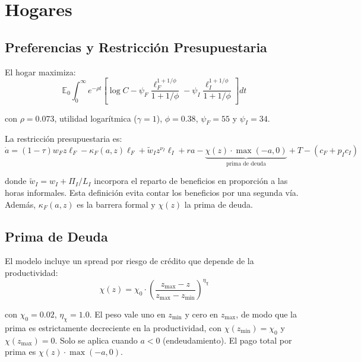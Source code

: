 \documentclass[12pt]{article}
\newcommand{\E}{\mathbb{E}}
\begin{document}
\section{Hogares}

\subsection{Preferencias y Restricción Presupuestaria}

El hogar maximiza:
\begin{equation}\label{eq:obj}
\E_0 \int_0^\infty e^{-\rho t} \left[ \log C - \psi_F\frac{\ell_F^{1+1/\phi}}{1+1/\phi} - \psi_I\frac{\ell_I^{1+1/\phi}}{1+1/\phi} \right] dt
\end{equation}

con $\rho=0.073$, utilidad logarítmica ($\gamma=1$), $\phi=0.38$, $\psi_F=55$ y $\psi_I=34$.

La restricción presupuestaria es:
\begin{equation}\label{eq:budget}
\dot{a} = (1-\tau) w_F z \ell_F - \kappa_F(a,z)\ell_F + \tilde{w}_I z^{\nu_I} \ell_I + r a - \underbrace{\chi(z) \cdot \max(-a, 0)}_{\text{prima de deuda}} + T - (c_F + p_I c_I)
\end{equation}

donde $\tilde{w}_I = w_I + \Pi_I/L_I$ incorpora el reparto de beneficios en proporción a las horas informales. Esta definición evita contar los beneficios por una segunda vía. Además, $\kappa_F(a,z)$ es la barrera formal y $\chi(z)$ la prima de deuda.

\subsection{Prima de Deuda}\label{sec:debtprem}

El modelo incluye un spread por riesgo de crédito que depende de la productividad:
\begin{equation}\label{eq:debtprem}
\chi(z) = \chi_0 \cdot \left(\frac{z_{\max} - z}{z_{\max} - z_{\min}}\right)^{\eta_\chi}
\end{equation}

con $\chi_0 = 0.02$, $\eta_\chi = 1.0$. El peso vale uno en $z_{\min}$ y cero en $z_{\max}$, de modo que la prima es estrictamente decreciente en la productividad, con $\chi(z_{\min}) = \chi_0$ y $\chi(z_{\max}) = 0$. Solo se aplica cuando $a < 0$ (endeudamiento). El pago total por prima es $\chi(z) \cdot \max(-a, 0)$.
\end{document}
